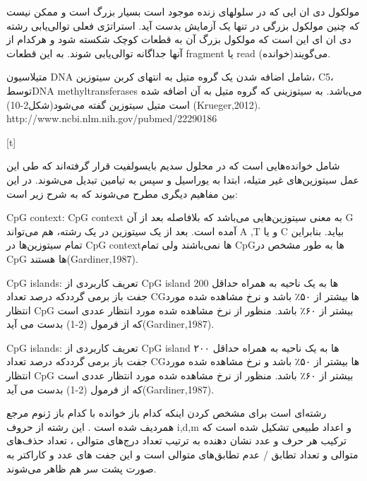
مولکول دی ان ایی که در سلولهای زنده موجود است بسیار بزرگ است و ممکن نیست که چنین مولکول بزرگی در تنها یک آزمایش بدست آید. استراتژی فعلی توالی‌یابی رشته دی ان ای این است که مولکول بزرگ آن به قطعات کوچک شکسته شود و هرکدام از آنها جداگانه توالی‌یابی شوند. به این قطعات fragment یا read (خوانده)می‌گویند.


متیلاسیون DNA شامل اضافه شدن یک گروه متیل به انتهای کربن سیتوزین، C5، توسطDNA methyltransferases می‌باشد. به سیتوزینی که گروه متیل به آن اضافه شده است متیل سیتوزین گفته می‌شود(شکل2-10) (Krueger,2012).
http://www.ncbi.nlm.nih.gov/pubmed/22290186


[t]



شامل خوانده‌هایی است که در محلول سدیم بایسولفیت قرار گرفته‌اند که طی این عمل سیتوزین‌های غیر متیله، ابتدا به یوراسیل و سپس به تیامین تبدیل می‌شوند. در این بین مفاهیم دیگری مطرح می‌شوند که به شرح زیر است:


 CpG context:
CpG context به معنی سیتوزین‌هایی می‌باشد که بلافاصله بعد از آن  G آمده است. بعد از یک سیتوزین در یک رشته، هم می‌تواند A ,T و یا C بیاید. بنابراین تمام سیتوزین‌ها در CpG contextها نمی‌باشند ولی تمام CpGها به طور مشخص در CpG ها هستند(Gardiner,1987).

 CpG islands:
تعریف کاربردی از CpG island ها به یک ناحیه به همراه حداقل 200 جفت باز برمی گرددکه درصد تعداد CGها بیشتر از ۵۰٪ باشد و نرخ مشاهده شده مورد انتظار CpG بیشتر از ۶۰٪ باشد. منظور از نرخ مشاهده شده مورد انتظار عددی است که از فرمول (2-1) بدست می آید(Gardiner,1987).



CpG islands:
تعریف کاربردی از CpG island ها به یک ناحیه به همراه حداقل ۲۰۰ جفت باز برمی گرددکه درصد تعداد CGها بیشتر از ۵۰٪ باشد و نرخ مشاهده شده مورد انتظار CpG بیشتر از ۶۰٪ باشد. منظور از نرخ مشاهده شده مورد انتظار عددی است که از فرمول (2-1) بدست می آید(Gardiner,1987).


رشته‌ای است برای مشخص کردن اینکه کدام باز خوانده با کدام باز ژنوم مرجع همردیف شده است . این رشته از حروف i,d,m و اعداد طبیعی تشکیل شده است که ترکیب هر حرف و عدد نشان دهنده به ترتیب تعداد درج‌های متوالی ، تعداد حذف‌های متوالی و تعداد تطابق / عدم تطابق‌های متوالی است و این جفت های عدد و کاراکتر به صورت پشت سر هم ظاهر می‌شوند.

